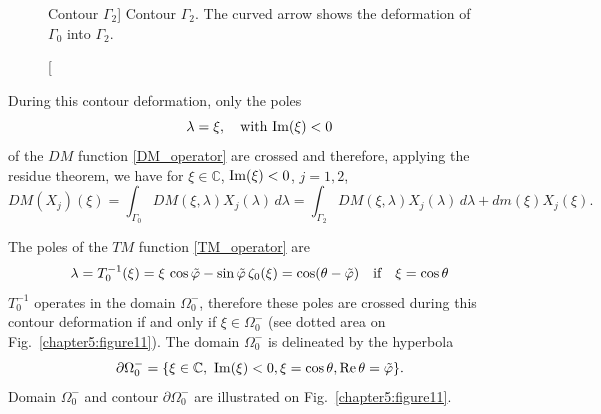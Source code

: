 \begin{figure}[ht]%
\centering
{}
\caption
[Contour $\Gamma_2$]
{Contour $\Gamma_2$. The curved arrow shows the deformation of $\Gamma_0$ into $\Gamma_2$.}
\label{chapter5:figure8}
\end{figure}

During this contour deformation, only the poles
\begin{equation}
\lambda = \xi, \quad \text{with } {\rm Im}(\xi) <0 
\end{equation}
of the $DM$ function \eqref{DM_operator} are crossed and therefore, applying the residue theorem, we have for $\xi \in \mathbb{C}$, ${\rm Im}(\xi) <0$, $j=1,2$, 
\begin{equation}
\label{DM_propag_sol}
DM(X_j)(\xi) = \int_{\Gamma_0} DM(\xi,\lambda) X_j(\lambda) \, d \lambda  = \int_{\Gamma_2} DM(\xi,\lambda) X_j(\lambda) \, d \lambda + dm(\xi) X_j(\xi).
\end{equation}

The poles of the $TM$ function \eqref{TM_operator} are
$$ \lambda = T_0^{-1}(\xi) = \xi \, \cos \tilde{\varphi}  - \sin \tilde{\varphi} \, \zeta_0(\xi) = \cos (\theta - \tilde{\varphi}) \quad \text{if} \quad \xi = \cos \theta $$
$T_0^{-1}$ operates in the domain $\Omega_0^-$, therefore these poles are crossed during this contour deformation if and only if $\xi \in \Omega_0^-$ (see dotted area on Fig.~\ref{chapter5:figure11}).
The domain $\Omega_0^-$ is delineated by the hyperbola 
\begin{equation}
\partial \Omega_0^- = \{   \xi \in \mathbb{C}, \ {\rm Im}(\xi) <0,  \xi = \cos \theta, {\rm Re} \, \theta = \tilde{\varphi} \}.
\end{equation}
Domain $\Omega_0^-$ and contour $\partial \Omega_0^-$ are illustrated on Fig.~\ref{chapter5:figure11}.   

